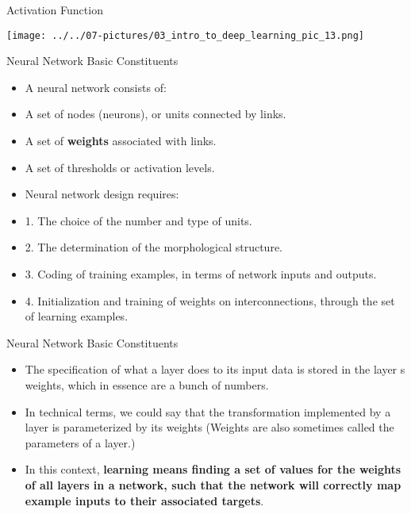 \documentclass[11pt]{beamer}
\begin{document}
\begin{frame}{Activation Function}
	\begin{center}
	\texttt{[image: ../../07-pictures/03\_intro\_to\_deep\_learning\_pic\_13.png]}
	\end{center}
\end{frame}
\begin{frame}{Neural Network Basic Constituents}
	\begin{itemize}
		\item A neural network consists of:
		\item A set of nodes (neurons), or units connected by links.
		\item A set of \textbf{weights} associated with links.
		\item A set of thresholds or activation levels.
		\item Neural network design requires:
		\item 1. The choice of the number and type of units.
		\item 2. The determination of the morphological structure.
		\item 3. Coding of training examples, in terms of network inputs and outputs.
		\item 4. Initialization and training of weights on interconnections, through the set of learning examples.
	\end{itemize}
\end{frame}
\begin{frame}{Neural Network Basic Constituents}
	\begin{itemize}
		\item The specification of what a layer does to its input data is stored in the layer s weights, which in essence are a bunch of numbers. 
		\item In technical terms, we could say that the transformation implemented by a layer is parameterized by its weights (Weights are also sometimes called the parameters of a layer.) 
		\item In this context, \textbf{learning means finding a set of values for the weights of all layers in a network, such that the network will correctly map example inputs to their associated targets}.
	\end{itemize}
\end{frame}
\end{document}
